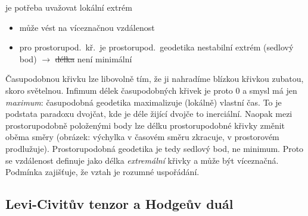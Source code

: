 \begin{minipage}{0.66\textwidth}
je potřeba uvažovat lokální extrém
\begin{itemize}[nosep]
  \item[--] může vést na víceznačnou vzdálenost
  \item[--] pro prostorupod.\ kř.\ je prostorupod.\ geodetika nestabilní extrém (sedlový bod) $\to$ \sout{délka} není minimální
\end{itemize}
\end{minipage}
\hfill
\begin{minipage}{0.32\textwidth}
\end{minipage}

\begin{vysvetleni}
Časupodobnou křivku lze libovolně  tím, že ji nahradíme blízkou křivkou zubatou, skoro světelnou. Infimum délek časupodobných křivek je proto $0$ a smysl má jen \emph{maximum}: časupodobná geodetika maximalizuje (lokálně) vlastní čas. To je podstata paradoxu dvojčat, kde je déle žijící dvojče to inerciální.
Naopak mezi prostorupodobně položenými body lze délku prostorupodobné křivky změnit oběma směry (obrázek: výchylka v časovém směru zkracuje, v prostorovém prodlužuje). Prostorupodobná geodetika je tedy sedlový bod, ne minimum. Proto se vzdálenost definuje jako délka \emph{extremální} křivky a může být víceznačná.
Podmínka  zajišťuje, že vztah  je rozumné uspořádání.
\end{vysvetleni}

\subsection{Levi-Civitův tenzor a Hodgeův duál} 

